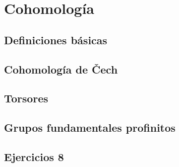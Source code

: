 \chapter{Cohomología}
\label{cap:8}

\section{Definiciones básicas}
\label{sec:8.1}

\section{Cohomología de \v{C}ech}
\label{sec:8.2}

\section{Torsores}
\label{sec:8.3}

\section{Grupos fundamentales profinitos}
\label{sec:8.4}

\section*{Ejercicios 8}
\label{sec:ejercicios-8}
